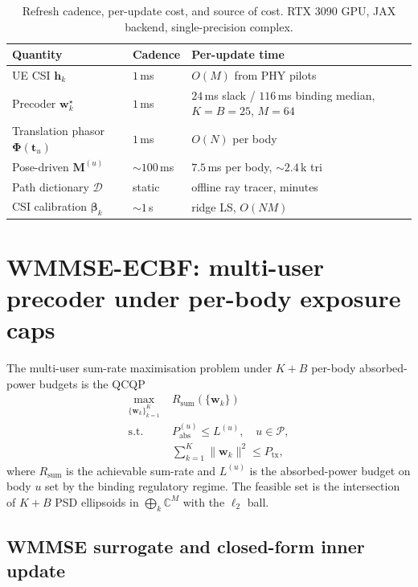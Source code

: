 \documentclass[journal,twocolumn,10pt]{IEEEtran}
\theoremstyle{plain}
\theoremstyle{remark}
\newcommand{\hh}{\mathbf{h}}
\newcommand{\ww}{\mathbf{w}}
\newcommand{\Pabs}{P_{\mathrm{abs}}}
\newcommand{\Mmat}{\mathbf{M}}
\newcommand{\Phimat}{\mathbf{\Phi}}
\newcommand{\Complex}{\mathbb{C}}
\newcommand{\AllBodies}{\mathcal{P}}
\newcommand{\Dict}{\mathcal{D}}
\begin{document}
\begin{table}[!t]
\caption{Refresh cadence, per-update cost, and source of cost.
RTX 3090 GPU, JAX backend, single-precision complex.}
\label{tab:cadence}
\centering
\small
\begin{tabular}{@{}p{}p{}p{}@{}}
\toprule
Quantity & Cadence & Per-update time \\
\midrule
UE CSI $\hh_k$ & $1\,$ms & $O(M)$ from PHY pilots \\
Precoder $\ww_k^\star$ & $1\,$ms & $24\,$ms slack / $116\,$ms binding median, $K = B = 25$, $M = 64$ \\
Translation phasor $\Phimat(\mathbf{t}_u)$ & $1\,$ms & $O(N)$ per body \\
Pose-driven $\Mmat^{(u)}$ & $\sim 100\,$ms & $7.5\,$ms per body, $\sim 2.4$\,k tri \\
Path dictionary $\Dict$ & static & offline ray tracer, minutes \\
CSI calibration $\bm\beta_k$ & $\sim 1\,$s & ridge LS, $O(N M)$ \\
\bottomrule
\end{tabular}
\end{table}


\section{WMMSE-ECBF: multi-user precoder under per-body
exposure caps}\label{sec:precoder}

The multi-user sum-rate maximisation problem under $K + B$ per-body
absorbed-power budgets is the QCQP
\begin{equation}\label{eq:P-MB}
\begin{aligned}
  \max_{\{\ww_k\}_{k=1}^K} \;& R_{\mathrm{sum}}(\{\ww_k\}) \\
  \text{s.t.}\;& \Pabs^{(u)} \leq L^{(u)},\quad u \in \AllBodies,\\
  & \sum_{k=1}^K \|\ww_k\|^2 \leq P_{\mathrm{tx}},
\end{aligned}
\end{equation}
where $R_{\mathrm{sum}}$ is the achievable sum-rate and $L^{(u)}$
is the absorbed-power budget on body $u$ set by the binding
regulatory regime. The feasible set is the intersection of
$K + B$ PSD ellipsoids in $\bigoplus_k \Complex^M$ with the
$\ell_2$ ball.

\subsection{WMMSE surrogate and closed-form inner update}\label{sec:wmmse-derivation}
\end{document}
